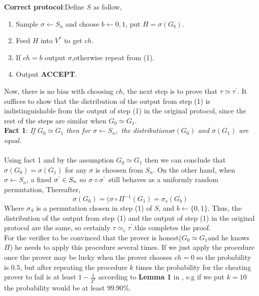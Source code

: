 \documentclass[12pt,a4paper]{article}
\begin{document}
\textbf{Correct protocol}:Define $S$ as follow,
\begin{enumerate}	
	\item
	\begin{enumerate}
		Sample $\sigma \longleftarrow S_n$ and choose $b \longleftarrow {0,1}$, put $H=\sigma(G_b)$.
	\end{enumerate}
	\item
	\begin{enumerate}
		Feed $H$ into $V^*$ to get $ch$.
	\end{enumerate}
	\item
	\begin{enumerate}
		If $ch=b$ output $\sigma$,otherwise repeat from (1).
	\end{enumerate}
	\item
	\begin{enumerate}
		Output \textbf{ACCEPT}.
	\end{enumerate}
\end{enumerate}
Now, there is no bias with choosing $ch$, the next step is to prove that $\tau \simeq \tau^{'}$. It suffices to show that the distribution of the output from step (1) is indistinguishable from the output of step (1) in the original protocol, since the rest of the steps are similar when $G_0 \simeq G_1$.\\

\textbf{Fact 1}: \textit{If $G_0\simeq G_1$ then for $\sigma \longleftarrow S_n,$ the distributions${\sigma(G_0)}$ and ${\sigma(G_1)}$ are equal}.\\
\\
Using fact 1 and by the assumption $G_0\simeq G_1$ then we can conclude that ${\sigma(G_0)} = {\sigma(G_1)}$ for any $\sigma$ is choosen from $S_n$.
On the other hand, when $\sigma \longleftarrow S_n$, a fixed $\sigma^{`}\in S_n$ so $\sigma \circ \sigma^{`}$ still behaves as a uniformly random permutation, Thereafter,\\
$${\sigma(G_0)}={(\sigma \circ \Pi^{-1}(G_1)}={\sigma_{s}(G_b)}$$
Where $\sigma_{S}$ is a permutation chosen in step (1) of $S$, and $b\longleftarrow\{0,1\}.$
Thus,  the distribution of the output from step (1) and the output of step (1) in the original protocol are the same, so certainly $\tau \simeq_{c} \tau^{'}$.this completes the proof.\\

For the verifier to be convinced that the prover is honest($G_0 \simeq G_1 $and he knows $\Pi$) he needs to apply this procedure several times. If we just apply the procedure once the prover may be lucky when the prover chooses $ch=0$  so the probability is $0.5$, but after repeating the procedure $k$ times the probability for the cheating prover to fail is at least $1-\frac{1}{2^{k}}$ according to \textbf{Lemma 1} in  \cite{lec-notes2:6}, e.g if we put $k=10$ the probability would be at least $99.90\%$.\\



 

 
\end{document}
